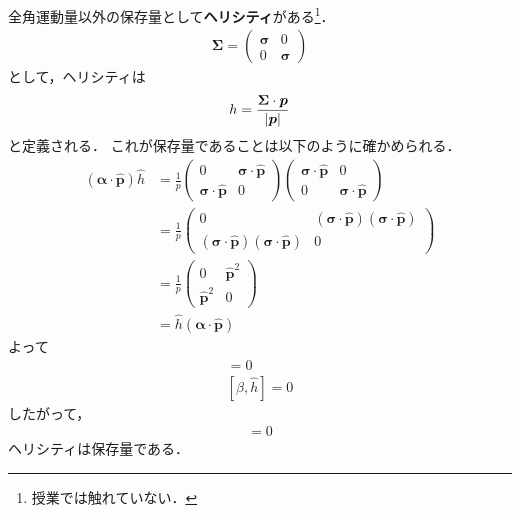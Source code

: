 \documentclass{report}
\begin{document}
  全角運動量以外の保存量として\textbf{ヘリシティ}がある\footnote{授業では触れていない．}．
  \begin{align}
    \bm{\Sigma} = 
    \begin{pmatrix}
      \bm{\sigma} & 0\\
      0 & \bm{\sigma}
    \end{pmatrix}
  \end{align}
  として，ヘリシティは
  \begin{align}
    h = \frac{\bm{\Sigma} \cdot \bm{p}}{\abs{\bm{p}}}
  \end{align}
  と定義される．
  これが保存量であることは以下のように確かめられる．
  \begin{align}
    (\bm{\alpha} \cdot \hat{\bm{p}}) \hat{h} &= \frac{1}{p}
    \begin{pmatrix}
      0 & \bm{\sigma} \cdot \hat{\bm{p}}\\
      \bm{\sigma} \cdot \hat{\bm{p}} & 0
    \end{pmatrix}
    \begin{pmatrix}
      \bm{\sigma} \cdot \hat{\bm{p}} & 0\\
      0 & \bm{\sigma} \cdot \hat{\bm{p}}
    \end{pmatrix}\\
    &= \frac{1}{p}
    \begin{pmatrix}
      0 & (\bm{\sigma} \cdot \hat{\bm{p}})(\bm{\sigma} \cdot \hat{\bm{p}})\\
      (\bm{\sigma} \cdot \hat{\bm{p}})(\bm{\sigma} \cdot \hat{\bm{p}}) & 0
    \end{pmatrix}\\
    &=\frac{1}{p}
    \begin{pmatrix}
      0 & \hat{\bm{p}}^2\\
      \hat{\bm{p}}^2 & 0
    \end{pmatrix}\\
    &= \hat{h}(\bm{\alpha}\cdot \hat{\bm{p}})
  \end{align}
  よって
  \begin{align}
    [\bm{\alpha} \cdot \hat{\bm{p}}, \hat{h}] = 0\\
    [\beta, \hat{h}] = 0
  \end{align}
  したがって，
  \begin{align}
    [\hat{H}, \hat{h}] = 0
  \end{align}
  ヘリシティは保存量である．
\end{document}
